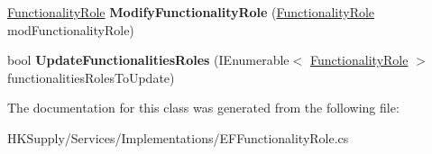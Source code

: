 \begin{DoxyCompactItemize}
\mbox{\label{class_h_k_supply_1_1_services_1_1_implementations_1_1_e_f_functionality_role_a69bbb7f8593ea4e0e70ce96625cf80e4}} 
\hyperlink{class_h_k_supply_1_1_models_1_1_functionality_role}{Functionality\+Role} {\bfseries Modify\+Functionality\+Role} (\hyperlink{class_h_k_supply_1_1_models_1_1_functionality_role}{Functionality\+Role} mod\+Functionality\+Role)
\item 
\mbox{\label{class_h_k_supply_1_1_services_1_1_implementations_1_1_e_f_functionality_role_a298798bba5c1a7e5a1db34803e3e4707}} 
bool {\bfseries Update\+Functionalities\+Roles} (I\+Enumerable$<$ \hyperlink{class_h_k_supply_1_1_models_1_1_functionality_role}{Functionality\+Role} $>$ functionalities\+Roles\+To\+Update)
\end{DoxyCompactItemize}


The documentation for this class was generated from the following file\+:\begin{DoxyCompactItemize}
\item 
H\+K\+Supply/\+Services/\+Implementations/E\+F\+Functionality\+Role.\+cs\end{DoxyCompactItemize}
